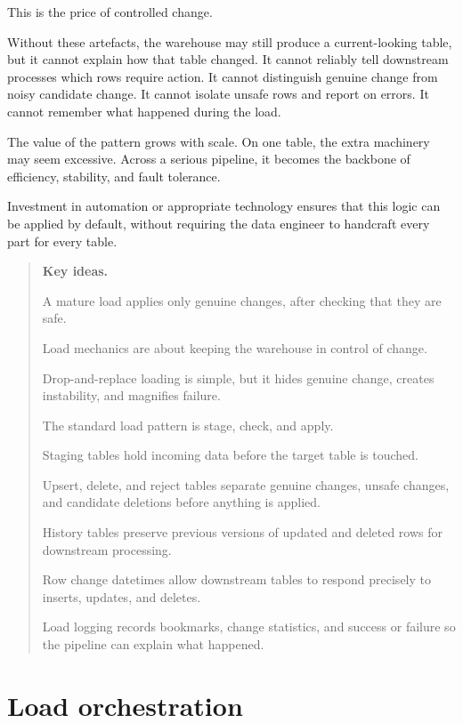 \documentclass[10pt,openany,10pt]{book}
\begin{document}
This is the price of controlled change.

Without these artefacts, the warehouse may still produce a
current-looking table, but it cannot explain how that table changed. It
cannot reliably tell downstream processes which rows require action. It
cannot distinguish genuine change from noisy candidate change. It cannot
isolate unsafe rows and report on errors. It cannot remember what
happened during the load.

The value of the pattern grows with scale. On one table, the extra
machinery may seem excessive. Across a serious pipeline, it becomes the
backbone of efficiency, stability, and fault tolerance.

Investment in automation or appropriate technology ensures that this
logic can be applied by default, without requiring the data engineer to
handcraft every part for every table.

\begin{quote}
\textbf{Key ideas.}

A mature load applies only genuine changes, after checking that they are
safe.

Load mechanics are about keeping the warehouse in control of change.

Drop-and-replace loading is simple, but it hides genuine change, creates
instability, and magnifies failure.

The standard load pattern is stage, check, and apply.

Staging tables hold incoming data before the target table is touched.

Upsert, delete, and reject tables separate genuine changes, unsafe
changes, and candidate deletions before anything is applied.

History tables preserve previous versions of updated and deleted rows
for downstream processing.

Row change datetimes allow downstream tables to respond precisely to
inserts, updates, and deletes.

Load logging records bookmarks, change statistics, and success or
failure so the pipeline can explain what happened.
\end{quote}

\newpage

\chapter{Load
orchestration}\label{docs-efficient-stable-pipeline-load-orchestration}
\end{document}
